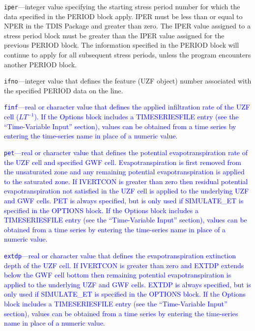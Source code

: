 \begin{description}
\item \texttt{iper}---integer value specifying the starting stress period number for which the data specified in the PERIOD block apply.  IPER must be less than or equal to NPER in the TDIS Package and greater than zero.  The IPER value assigned to a stress period block must be greater than the IPER value assigned for the previous PERIOD block.  The information specified in the PERIOD block will continue to apply for all subsequent stress periods, unless the program encounters another PERIOD block.

\item \texttt{ifno}---integer value that defines the feature (UZF object) number associated with the specified PERIOD data on the line.

\item \textcolor{blue}{\texttt{finf}---real or character value that defines the applied infiltration rate of the UZF cell ($LT^{-1}$). If the Options block includes a TIMESERIESFILE entry (see the ``Time-Variable Input'' section), values can be obtained from a time series by entering the time-series name in place of a numeric value.}

\item \textcolor{blue}{\texttt{pet}---real or character value that defines the potential evapotranspiration rate of the UZF cell and specified GWF cell. Evapotranspiration is first removed from the unsaturated zone and any remaining potential evapotranspiration is applied to the saturated zone. If IVERTCON is greater than zero then residual potential evapotranspiration not satisfied in the UZF cell is applied to the underlying UZF and GWF cells. PET is always specified, but is only used if SIMULATE\_ET is specified in the OPTIONS block. If the Options block includes a TIMESERIESFILE entry (see the ``Time-Variable Input'' section), values can be obtained from a time series by entering the time-series name in place of a numeric value.}

\item \textcolor{blue}{\texttt{extdp}---real or character value that defines the evapotranspiration extinction depth of the UZF cell. If IVERTCON is greater than zero and EXTDP extends below the GWF cell bottom then remaining potential evapotranspiration is applied to the underlying UZF and GWF cells. EXTDP is always specified, but is only used if SIMULATE\_ET is specified in the OPTIONS block. If the Options block includes a TIMESERIESFILE entry (see the ``Time-Variable Input'' section), values can be obtained from a time series by entering the time-series name in place of a numeric value.}


\end{description}
